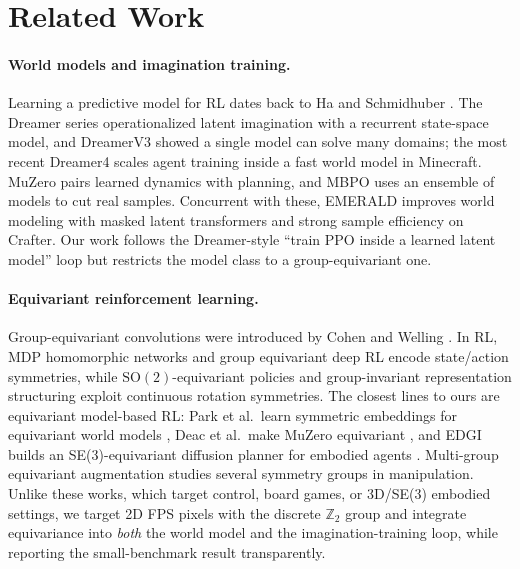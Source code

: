 \documentclass[sigconf,anonymous]{acmart}
\begin{document}
\section{Related Work}\label{sec:rw}

\paragraph{World models and imagination training.}
Learning a predictive model for RL dates back to Ha and Schmidhuber
\cite{worldmodels2018}. The Dreamer series \cite{dreamerv1,dreamerv2}
operationalized latent imagination with a recurrent state-space model, and
DreamerV3 \cite{dreamerv3} showed a single model can solve many domains; the
most recent Dreamer4 \cite{dreamer42025} scales agent training inside a
fast world model in Minecraft. MuZero \cite{muzero2020} pairs learned
dynamics with planning, and MBPO \cite{mbpo2019} uses an ensemble of models
to cut real samples. Concurrent with these, EMERALD \cite{emerald2025}
improves world modeling with masked latent transformers and strong
sample efficiency on Crafter. Our work follows the Dreamer-style
``train PPO inside a learned latent model'' loop but restricts the model class
to a group-equivariant one.

\paragraph{Equivariant reinforcement learning.}
Group-equivariant convolutions were introduced by Cohen and Welling
\cite{gcnn2016}. In RL, MDP homomorphic networks \cite{mdphomo2020} and group
equivariant deep RL \cite{geodrl2020} encode state/action symmetries, while
$\mathrm{SO}(2)$-equivariant policies \cite{so2rl2022} and group-invariant
representation structuring \cite{groupinv2022} exploit continuous rotation
symmetries. The closest lines to ours are equivariant model-based RL: Park
et al.\ learn symmetric embeddings for equivariant world models
\cite{sen2022}, Deac et al.\ make MuZero equivariant \cite{eqmuzero2023},
and EDGI builds an SE(3)-equivariant diffusion planner for embodied agents
\cite{edgi2023}. Multi-group equivariant augmentation \cite{multigroup2025}
studies several symmetry groups in manipulation. Unlike these works, which
target control, board games, or 3D/SE(3) embodied settings, we target 2D
FPS pixels with the discrete $\mathbb Z_2$ group and integrate equivariance
into \emph{both} the world model and the imagination-training loop, while
reporting the small-benchmark result transparently.
\end{document}
